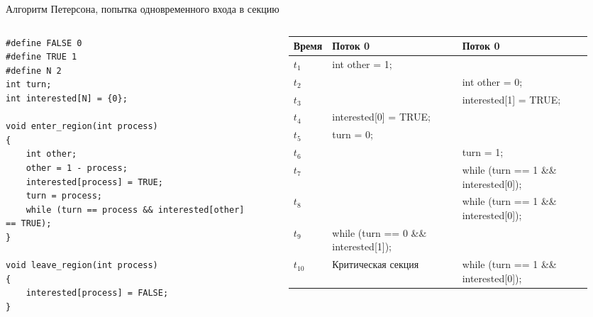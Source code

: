 \documentclass[aspectratio=169,14pt]{beamer}
\begin{document}
\begin{frame}[containsverbatim]{Алгоритм Петерсона, попытка одновременного входа в секцию}
    \begin{columns}
        \begin{column}{0.32\textwidth}
            \begin{tiny}
                \begin{verbatim}
#define FALSE 0
#define TRUE 1
#define N 2
int turn;
int interested[N] = {0};

void enter_region(int process)
{
    int other;
    other = 1 - process;
    interested[process] = TRUE;
    turn = process;
    while (turn == process && interested[other] == TRUE);
}

void leave_region(int process)
{
    interested[process] = FALSE;
}
                \end{verbatim}
            \end{tiny}
        \end{column}
        \begin{column}{0.68\textwidth}
            \begin{figure}[htp]
                \centering
                \begin{tiny}
                    \begin{tabular}{p{0.5cm}|p{2.4cm}|p{2.4cm}}
                        \hline
                        \textbf{Время} & \textbf{Поток 0} & \textbf{Поток 0} \\ \hline
                        $t_{1}$ & int other = 1; & \\ \hline
                        $t_{2}$ & & int other = 0; \\ \hline
                        $t_{3}$ &  & interested[1] = TRUE;   \\ \hline
                        $t_{4}$ & interested[0] = TRUE; & \\ \hline
                        $t_{5}$ & turn = 0; & \\ \hline
                        $t_{6}$ & & turn = 1; \\ \hline
                        $t_{7}$ & & while (turn == 1 \&\& interested[0]); \\ \hline
                        $t_{8}$ & & while (turn == 1 \&\& interested[0]); \\ \hline
                        $t_{9}$ & while (turn == 0 \&\& interested[1]); & \\ \hline
                        $t_{10}$ & \multirow{3}{=}{Критическая секция} & while (turn == 1 \&\& interested[0]); \\ \cline{1-1}\cline{3-3}

\end{tabular}
\end{tiny}
\end{figure}
\end{column}
\end{columns}
\end{frame}
\end{document}
